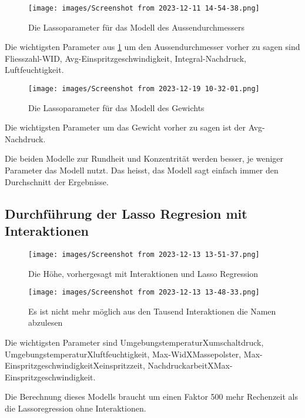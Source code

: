 \begin{figure} 
   
  \texttt{[image: images/Screenshot from 2023-12-11 14-54-38.png]}
  \caption{Die Lassoparameter für das Modell des Aussendurchmessers}
  \label{fig:PLA}
\end{figure}
Die wichtigsten Parameter aus \ref{fig:PLA} um den Aussendurchmesser vorher zu sagen sind Fliesszahl-WID, Avg-Einspritzgeschwindigkeit, Integral-Nachdruck, Luftfeuchtigkeit.

\begin{figure} 
   
  \texttt{[image: images/Screenshot from 2023-12-19 10-32-01.png]}
  \caption{Die Lassoparameter für das Modell des Gewichts}
  \label{fig:}
\end{figure}
Die wichtigsten Parameter um das Gewicht vorher zu sagen ist der Avg-Nachdruck.

Die beiden Modelle zur Rundheit und Konzentrität werden besser, je weniger Parameter das Modell nutzt. Das heisst, das Modell sagt einfach immer den Durchschnitt der Ergebnisse.

\subsection{Durchführung der Lasso Regresion mit Interaktionen}
\begin{figure} 
   
  \texttt{[image: images/Screenshot from 2023-12-13 13-51-37.png]}
  \caption{Die Höhe, vorhergesagt mit Interaktionen und Lasso Regression}
  \label{fig:LassoInter}
\end{figure}

\begin{figure} 
   
  \texttt{[image: images/Screenshot from 2023-12-13 13-48-33.png]}
  \caption{Es ist nicht mehr möglich aus den Tausend Interaktionen die Namen abzulesen}
  \label{fig:PLassoInter}
\end{figure}

Die wichtigsten Parameter sind UmgebungstemperaturXumschaltdruck, UmgebungstemperaturXluftfeuchtigkeit, Max-WidXMassepolster, Max-EinspritzgeschwindigkeitXeinspritzzeit, NachdruckarbeitXMax-Einspritzgeschwindigkeit.

Die Berechnung dieses Modells braucht um einen Faktor 500 mehr Rechenzeit als die Lassoregression ohne Interaktionen.

